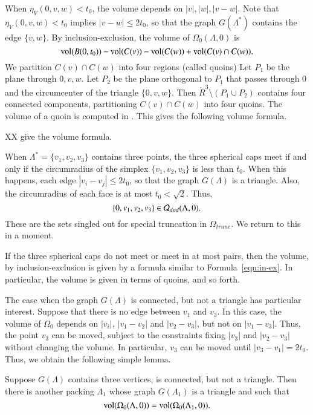 When $\eta_V(0,v,w) < t_0$, the volume depends on
$|v|,|w|,|v-w|$.  Note that $\eta_V(0,v,w) < t_0$ implies
$|v-w|\le 2t_0$, so that the graph $G(\Lambda^*)$ contains
the edge $\{v,w\}$.
By inclusion-exclusion, the volume of $\Omega_0(\Lambda,0)$ is
   \begin{equation}\label{eqn:in-ex}
   {\operatorname{vol}}(B(0,t_0)) - {\operatorname{vol}}(C(v)) - {\operatorname{vol}}(C(w)) +
 {\operatorname{vol}}(C(v) \cap C(w)).
   \end{equation}
We partition $C(v)\cap C(w)$ into four regions (called quoins)
Let $P_1$ be the plane through $0,v,w$.  Let $P_2$ be the
plane orthogonal to $P_1$ that passes through $0$ and the circumcenter
of the triangle $\{0,v,w\}$.  Then $\ring{R}^3\setminus (P_1\cup P_2)$ 
contains four connected components, partitioning $C(v)\cap C(w)$
into four quoins.  The volume of a quoin is computed in \cite[7.3]{DCG}.
This gives the following volume formula.

XX give the volume formula.

When $\Lambda^*=\{v_1,v_2,v_3\}$ contains three points, the three spherical
caps meet if and only if the circumradius of the simplex
$\{v_1,v_2,v_3\}$ is less than $t_0$.  When this happens, each
edge $|v_i-v_j|\le 2t_0$, so that the graph $G(\Lambda)$ is a
triangle.  Also, the circumradius of each face is at most
$t_0 < \sqrt2$.  Thus, 
  $$\{0,v_1,v_2,v_3\}\in{\mathcal Q}_{dod}(\Lambda,0).$$
These are the sets singled out for special truncation in $\Omega_{trunc}$.
We return to this in a moment.

If the three spherical caps do not meet or meet in at most pairs,
then the volume, by inclusion-exclusion is given by a formula
similar to Formula~\ref{eqn:in-ex}.  In particular, the volume
is given in terms of quoins, and so forth.

The case when the graph $G(\Lambda)$ is connected, but not a triangle
has particular interest.  Suppose that there is no edge between
$v_1$ and $v_3$. In this case, the volume of $\Omega_0$ depends on
$|v_i|$, $|v_1-v_2|$ and $|v_2-v_3|$, but not on $|v_1-v_3|$.
Thus, the point $v_3$ can be moved, subject to the constraints
fixing $|v_3|$ and $|v_2-v_3|$ without changing the volume.
In particular, $v_3$ can be moved until $|v_3-v_1|=2t_0$.  Thus,
we obtain the following simple lemma.  

\begin{lemma}\label{lemma:3tri}  
Suppose $G(\Lambda)$ contains three vertices,
is connected, but not a triangle.  Then there is another packing
$\Lambda_1$ whose graph $G(\Lambda_1)$ is a triangle and such
that
  $$
  {\operatorname{vol}}(\Omega_0(\Lambda,0)) = {\operatorname{vol}}(\Omega_0(\Lambda_1,0)).
  $$
\end{lemma}

